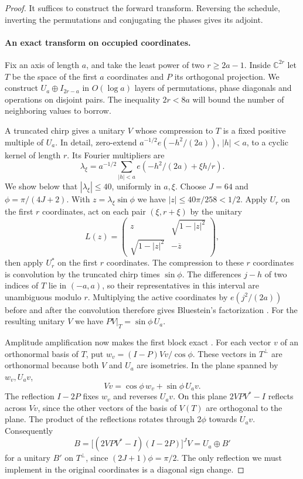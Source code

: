 \begin{proof}
It suffices to construct the forward transform. Reversing the schedule,
inverting the permutations and conjugating the phases gives its adjoint.

\paragraph{An exact transform on occupied coordinates.}
Fix an axis of length \(a\), and take the least power of two
\(r\ge 2a-1\). Inside \(\mathbb C^{2r}\) let \(T\) be the space of
the first \(a\) coordinates and \(P\) its orthogonal projection.
We construct \(U_a\oplus I_{2r-a}\) in \(O(\log a)\) layers of
permutations, phase diagonals and operations on disjoint pairs.
The inequality \(2r<8a\) will bound the number of neighboring values
to borrow.

A truncated chirp gives a unitary \(V\) whose compression to \(T\)
is a fixed positive multiple of \(U_a\). In detail, zero-extend
\(a^{-1/2}e(-h^2/(2a))\), \(|h|<a\), to a cyclic kernel of length
\(r\). Its Fourier multipliers are
\[
              \lambda_\xi
        =a^{-1/2}\sum_{|h|<a} e(-h^2/(2a)+\xi h/r).
\]
We show below that \(|\lambda_\xi|\le40\), uniformly in \(a,\xi\).
Choose \(J=64\) and \(\phi=\pi/(4J+2)\). With
\(z=\lambda_\xi\sin\phi\) we have \(|z|\le40\pi/258<1/2\).
Apply \(U_r\) on the first \(r\) coordinates, act on each pair
\((\xi,r+\xi)\) by the unitary
\[
             L(z)=
             \begin{pmatrix}z&\sqrt{1-|z|^2}\\
                            \sqrt{1-|z|^2}&-\overline z\end{pmatrix},
\]
then apply \(U_r^*\) on the first \(r\) coordinates. The compression
to these \(r\) coordinates is convolution by the truncated chirp
times \(\sin\phi\). The differences \(j-h\) of two indices of \(T\)
lie in \((-a,a)\), so their representatives in this interval are
unambiguous modulo \(r\). Multiplying the
active coordinates by \(e(j^2/(2a))\) before and after the
convolution therefore gives Bluestein's factorization
\cite{bluestein}. For the resulting unitary \(V\) we have
\(PV|_T=\sin\phi\,U_a\).

Amplitude amplification now makes the first block exact
\cite{BHMT,berry,MZ}. For each vector \(v\) of an orthonormal basis
of \(T\), put \(w_v=(I-P)Vv/\cos\phi\). These vectors in \(T^\perp\)
are orthonormal because both \(V\) and \(U_a\) are isometries.
In the plane spanned by \(w_v,U_av\),
\[
                    Vv=\cos\phi\,w_v+\sin\phi\,U_av .
\]
The reflection \(I-2P\) fixes \(w_v\) and reverses \(U_av\). On this
plane \(2VPV^*-I\) reflects across \(Vv\), since the other vectors
of the basis of \(V(T)\) are orthogonal to the plane. The product
of the reflections rotates through \(2\phi\) towards \(U_av\).
Consequently
\[
                  B=\bigl[(2VPV^*-I)(I-2P)\bigr]^J V
                    = U_a\oplus B'
\]
for a unitary \(B'\) on \(T^\perp\), since \((2J+1)\phi=\pi/2\).
The only reflection we must implement in the original coordinates
is a diagonal sign change.


\end{proof}
